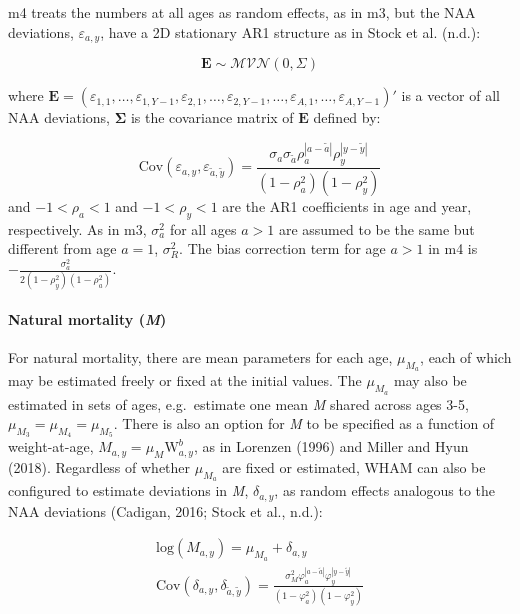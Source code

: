 \documentclass[]{article}
\let\oldparagraph\paragraph
\renewcommand{\paragraph}[1]{\oldparagraph{#1}\mbox{}}
\begin{document}
m4 treats the numbers at all ages as random effects, as in m3, but the
NAA deviations, \(\varepsilon_{a,y}\), have a 2D stationary AR1
structure as in Stock et al. (n.d.):

\[\mathbf{E} \sim \mathcal{MVN} \left( 0, \Sigma \right)\]

where
\(\mathbf{E} = (\varepsilon_{1,1}, \ldots, \varepsilon_{1,Y-1}, \varepsilon_{2,1}, \ldots, \varepsilon_{2,Y-1}, \ldots, \varepsilon_{A,1}, \ldots, \varepsilon_{A,Y-1})'\)
is a vector of all NAA deviations, \(\boldsymbol{\Sigma}\) is the
covariance matrix of \(\mathbf{E}\) defined by:

\[ \text{Cov} \left( \varepsilon_{a,y}, \varepsilon_{\tilde{a},\tilde{y}} \right) = \frac{\sigma_a \sigma_{\tilde{a}} \rho^{|a-\tilde{a}|}_{a} \rho^{|y-\tilde{y}|}_{y}}{\left(1-\rho^2_{a}\right) \left(1-\rho^2_{y}\right)}\]
and \(-1<\rho_a<1\) and \(-1<\rho_y<1\) are the AR1 coefficients in age
and year, respectively. As in m3, \(\sigma^2_a\) for all ages \(a > 1\)
are assumed to be the same but different from age \(a = 1\),
\(\sigma^2_R\). The bias correction term for age \(a > 1\) in m4 is
\(- \frac{\sigma^2_a}{2 (1-\rho^2_y)(1-\rho^2_a)}\).

\hypertarget{natural-mortality-m}{%
\paragraph{\texorpdfstring{Natural mortality
(\emph{M})}{Natural mortality (M)}}\label{natural-mortality-m}}

For natural mortality, there are mean parameters for each age,
\(\mu_{M_a}\), each of which may be estimated freely or fixed at the
initial values. The \(\mu_{M_a}\) may also be estimated in sets of ages,
e.g.~estimate one mean \emph{M} shared across ages 3-5,
\(\mu_{M_3} = \mu_{M_4} = \mu_{M_5}\). There is also an option for
\emph{M} to be specified as a function of weight-at-age,
\(M_{a,y} = \mu_M \text{W}^b_{a,y}\), as in Lorenzen (1996) and Miller
and Hyun (2018). Regardless of whether \(\mu_{M_a}\) are fixed or
estimated, WHAM can also be configured to estimate deviations in
\emph{M}, \(\delta_{a,y}\), as random effects analogous to the NAA
deviations (Cadigan, 2016; Stock et al., n.d.):

\begin{equation}
  \begin{array}{cc}
    \text{log}\left( M_{a,y} \right) = \mu_{M_a} + \delta_{a,y} \\
    \text{Cov} \left( \delta_{a,y}, \delta_{\tilde{a},\tilde{y}} \right) = \frac{\sigma^2_M \varphi^{|a-\tilde{a}|}_{a} \varphi^{|y-\tilde{y}|}_{y}}{\left(1-\varphi^2_{a}\right) \left(1-\varphi^2_{y}\right)}
  \end{array}
\end{equation}
\end{document}
